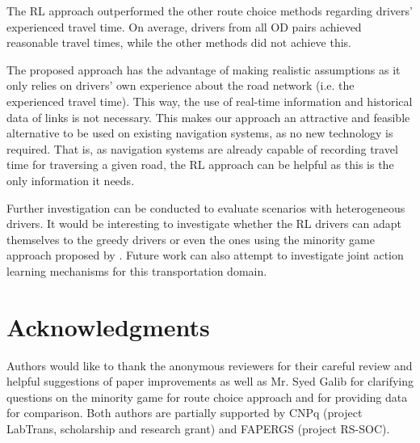 \documentclass{RITA}
\begin{document}
The RL approach outperformed the other route choice methods regarding drivers' experienced travel time. On average, drivers from all OD pairs achieved reasonable travel times, while the other methods did not achieve this.


The proposed approach has the advantage of making realistic assumptions as it only relies on drivers' own experience about the road network (i.e. the experienced travel time). This way, the use of real-time information and historical data of links is not necessary. This makes our approach an attractive and feasible alternative to be used on existing navigation systems, as no new technology is required. That is, as navigation systems are already capable of recording travel time for traversing a given road, the RL approach can be helpful as this is the only information it needs.

Further investigation can be conducted to evaluate scenarios with heterogeneous drivers. It would be interesting to investigate whether the RL drivers can adapt themselves to the greedy drivers or even the ones using the minority game approach proposed by \cite{Galib&Moser2011}. Future work can also attempt to investigate joint action learning mechanisms for this transportation domain. %

\section*{Acknowledgments}

Authors would like to thank the anonymous reviewers for their careful review and helpful suggestions of paper improvements as well as Mr. Syed Galib for clarifying questions on the minority game for route choice approach and for providing data for comparison. Both authors are partially supported by CNPq (project LabTrans, scholarship and research grant) and FAPERGS (project RS-SOC). %


 
\end{document}
